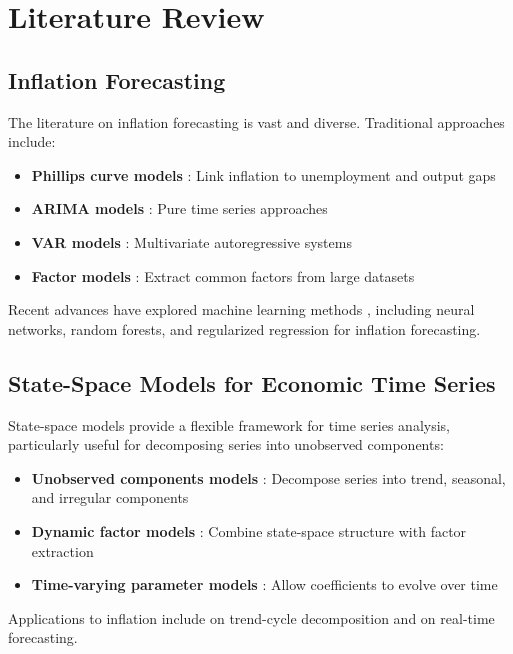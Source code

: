 \section{Literature Review}

\subsection{Inflation Forecasting}

The literature on inflation forecasting is vast and diverse. Traditional approaches include:

\begin{itemize}
    \item \textbf{Phillips curve models} \citep{phillips1958, stock2007}: Link inflation to unemployment and output gaps
    \item \textbf{ARIMA models} \citep{box1970}: Pure time series approaches
    \item \textbf{VAR models} \citep{sims1980}: Multivariate autoregressive systems
    \item \textbf{Factor models} \citep{stock2002}: Extract common factors from large datasets
\end{itemize}

Recent advances have explored machine learning methods \citep{goulet2018, medeiros2021}, including neural networks, random forests, and regularized regression for inflation forecasting.

\subsection{State-Space Models for Economic Time Series}

State-space models provide a flexible framework for time series analysis, particularly useful for decomposing series into unobserved components:

\begin{itemize}
    \item \textbf{Unobserved components models} \citep{harvey1989, durbin2012}: Decompose series into trend, seasonal, and irregular components
    \item \textbf{Dynamic factor models} \citep{geweke1977}: Combine state-space structure with factor extraction
    \item \textbf{Time-varying parameter models} \citep{primiceri2005}: Allow coefficients to evolve over time
\end{itemize}

Applications to inflation include \citet{stock2007} on trend-cycle decomposition and \citet{clark2006} on real-time forecasting.

